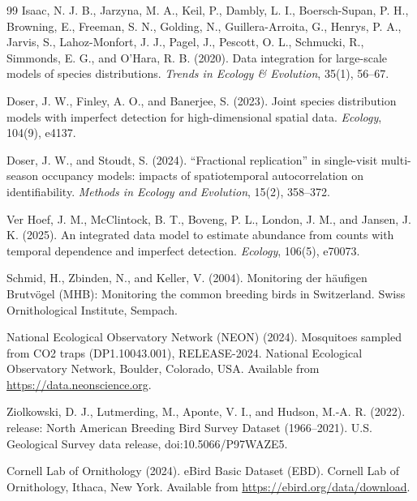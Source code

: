 \documentclass[preprint,12pt]{elsarticle}
\theoremstyle{definition}
\begin{document}
\begin{thebibliography}{99}
Isaac, N. J. B., Jarzyna, M. A., Keil, P., Dambly, L. I., Boersch-Supan, P. H., Browning, E., Freeman, S. N., Golding, N., Guillera-Arroita, G., Henrys, P. A., Jarvis, S., Lahoz-Monfort, J. J., Pagel, J., Pescott, O. L., Schmucki, R., Simmonds, E. G., and O'Hara, R. B. (2020).
\newblock Data integration for large-scale models of species distributions.
\newblock \emph{Trends in Ecology \& Evolution}, 35(1), 56--67.

Doser, J. W., Finley, A. O., and Banerjee, S. (2023).
\newblock Joint species distribution models with imperfect detection for high-dimensional spatial data.
\newblock \emph{Ecology}, 104(9), e4137.

Doser, J. W., and Stoudt, S. (2024).
\newblock ``Fractional replication'' in single-visit multi-season occupancy models: impacts of spatiotemporal autocorrelation on identifiability.
\newblock \emph{Methods in Ecology and Evolution}, 15(2), 358--372.

Ver Hoef, J. M., McClintock, B. T., Boveng, P. L., London, J. M., and Jansen, J. K. (2025).
\newblock An integrated data model to estimate abundance from counts with temporal dependence and imperfect detection.
\newblock \emph{Ecology}, 106(5), e70073.

Schmid, H., Zbinden, N., and Keller, V. (2004).
\newblock Monitoring der h\"aufigen Brutv\"ogel (MHB): Monitoring the common breeding birds in Switzerland.
\newblock Swiss Ornithological Institute, Sempach.

National Ecological Observatory Network (NEON) (2024).
\newblock Mosquitoes sampled from CO2 traps (DP1.10043.001), RELEASE-2024.
\newblock National Ecological Observatory Network, Boulder, Colorado, USA. Available from \url{https://data.neonscience.org}.

Ziolkowski, D. J., Lutmerding, M., Aponte, V. I., and Hudson, M.-A. R. (2022).
 release: North American Breeding Bird Survey Dataset (1966--2021).
\newblock U.S. Geological Survey data release, doi:10.5066/P97WAZE5.

Cornell Lab of Ornithology (2024).
\newblock eBird Basic Dataset (EBD).
\newblock Cornell Lab of Ornithology, Ithaca, New York. Available from \url{https://ebird.org/data/download}.

\end{thebibliography}
\end{document}
